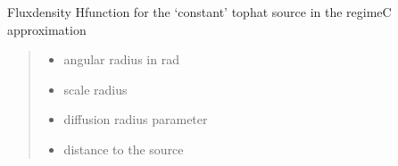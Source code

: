 \documentclass[letterpaper,10pt,english]{sphinxmanual}
\begin{document}
\begin{fulllineitems}
\label{\detokenize{diffsph.profiles:diffsph.profiles.analytics.cofdC}}
\pysigstartsignatures
{}
\pysigstopsignatures
\sphinxAtStartPar
Flux\sphinxhyphen{}density H\sphinxhyphen{}function for the ‘constant’ top\sphinxhyphen{}hat source in the regime\sphinxhyphen{}C approximation
\begin{quote}\begin{description}
\begin{itemize}
\item {} 
\sphinxAtStartPar
{} \textendash{} angular radius in rad

\item {} 
\sphinxAtStartPar
{} \textendash{} scale radius

\item {} 
\sphinxAtStartPar
{} \textendash{} diffusion radius parameter

\item {} 
\sphinxAtStartPar
{} \textendash{} distance to the source

\end{itemize}

\end{description}\end{quote}

\end{fulllineitems}

\end{document}
